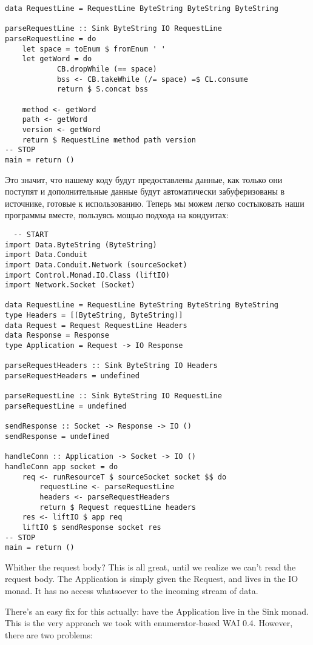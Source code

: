 \begin{verbaim}
\begin{lstlisting}
data RequestLine = RequestLine ByteString ByteString ByteString

parseRequestLine :: Sink ByteString IO RequestLine
parseRequestLine = do
    let space = toEnum $ fromEnum ' '
    let getWord = do
            CB.dropWhile (== space)
            bss <- CB.takeWhile (/= space) =$ CL.consume
            return $ S.concat bss

    method <- getWord
    path <- getWord
    version <- getWord
    return $ RequestLine method path version
-- STOP
main = return ()
\end{lstlisting}
Это значит, что нашему коду будут предоставлены данные, как только они поступят и дополнительные данные будут автоматически забуферизованы в источнике, готовые к использованию. Теперь мы можем легко состыковать наши программы вместе, пользуясь мощью подхода на кондуитах:
\begin{lstlisting}
  -- START
import Data.ByteString (ByteString)
import Data.Conduit
import Data.Conduit.Network (sourceSocket)
import Control.Monad.IO.Class (liftIO)
import Network.Socket (Socket)

data RequestLine = RequestLine ByteString ByteString ByteString
type Headers = [(ByteString, ByteString)]
data Request = Request RequestLine Headers
data Response = Response
type Application = Request -> IO Response

parseRequestHeaders :: Sink ByteString IO Headers
parseRequestHeaders = undefined

parseRequestLine :: Sink ByteString IO RequestLine
parseRequestLine = undefined

sendResponse :: Socket -> Response -> IO ()
sendResponse = undefined

handleConn :: Application -> Socket -> IO ()
handleConn app socket = do
    req <- runResourceT $ sourceSocket socket $$ do
        requestLine <- parseRequestLine
        headers <- parseRequestHeaders
        return $ Request requestLine headers
    res <- liftIO $ app req
    liftIO $ sendResponse socket res
-- STOP
main = return ()
\end{lstlisting}
Whither the request body?
This is all great, until we realize we can't read the request body. The
Application is simply given the Request, and lives in the
IO monad. It has no access whatsoever to the incoming stream of data.

There's an easy fix for this actually: have the Application live in the
Sink monad. This is the very approach we took with
enumerator-based WAI 0.4. However, there are two problems:



\end{verbaim}
